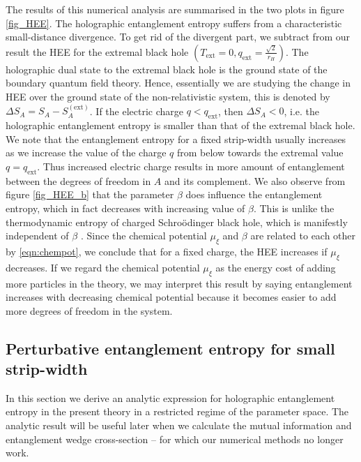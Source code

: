 \documentclass[12pt,a4paper]{article}
\numberwithin{equation}{section}
\begin{document}
The results of this numerical analysis are summarised in the two plots in figure \ref{fig_HEE}. The holographic entanglement entropy suffers from a characteristic small-distance divergence. To get rid of the divergent part, we subtract from our result the HEE for the extremal black hole $\left( T_{\mathrm{ext}} = 0, q_{\mathrm{ext}} = \frac{\sqrt{2}}{r_H} \right)$. The holographic dual state to the extremal black hole is the ground state of the boundary quantum field theory. Hence, essentially we are studying the change in HEE over the ground state of the non-relativistic system, this is denoted by $\Delta S_A = S_A - S_A^{(\mathrm{ext})}$. If the electric charge $q < q_{\mathrm{ext}}$, then $\Delta S_A < 0$, i.e. the holographic entanglement entropy is smaller than that of the extremal black hole. We note that the entanglement entropy for a fixed strip-width usually increases as we increase the value of the charge $q$ from below towards the extremal value $q=q_{\mathrm{ext}}$. Thus increased electric charge results in more amount of entanglement between the degrees of freedom in $A$ and its complement. We also observe from figure \ref{fig_HEE_b} that the parameter $\beta$ does influence the entanglement entropy, which in fact decreases with increasing value of $\beta$. This is unlike the thermodynamic entropy of charged Schro\"{o}dinger black hole, which is manifestly independent of $\beta$ \cite{Adams:2009dm}. Since the chemical potential $\mu_{\xi}$ and $\beta$ are related to each other by \eqref{eqn:chempot}, we conclude that for a fixed charge, the HEE increases if $\mu_{\xi}$ decreases. If we regard the chemical potential $\mu_{\xi}$ as the energy cost of adding more particles in the theory, we may interpret this result by saying entanglement increases with decreasing chemical potential because it becomes easier to add more degrees of freedom in the system.

\subsection{Perturbative entanglement entropy for small strip-width}

In this section we derive an analytic expression for holographic entanglement entropy in the present theory in a restricted regime of the parameter space. The analytic result will be useful later when we calculate the mutual information and entanglement wedge cross-section -- for which our numerical methods no longer work.
\end{document}
